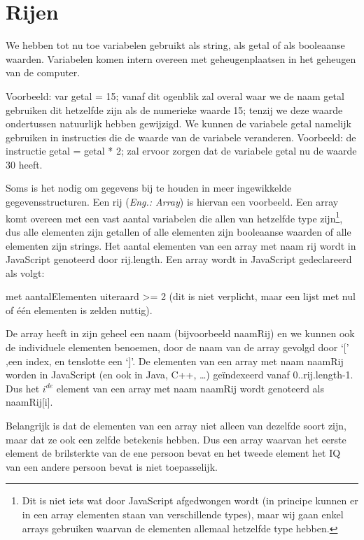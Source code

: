 \chapter{Rijen}

We hebben tot nu toe variabelen gebruikt als string, als getal of als booleaanse waarden. Variabelen komen intern overeen met geheugenplaatsen in het geheugen van de computer.

Voorbeeld: var getal = 15; vanaf dit ogenblik zal overal waar we de naam getal gebruiken dit hetzelfde zijn als de numerieke waarde 15; tenzij we deze waarde ondertussen natuurlijk hebben gewijzigd. We kunnen de variabele getal namelijk gebruiken in instructies die de waarde van de variabele veranderen. Voorbeeld: de instructie getal = getal * 2;  zal ervoor zorgen dat de variabele getal nu de waarde 30 heeft.

Soms is het nodig om gegevens bij te houden in meer ingewikkelde gegevensstructuren. Een rij (\emph{Eng.: Array}) is hiervan een voorbeeld. Een array komt overeen met een vast aantal variabelen die allen van hetzelfde type zijn\footnote{Dit is niet iets wat door JavaScript afgedwongen wordt (in principe kunnen er in een array elementen staan van verschillende types), maar wij gaan enkel arrays gebruiken waarvan de elementen allemaal hetzelfde type hebben.}, dus alle elementen zijn getallen of alle elementen zijn booleaanse waarden of alle elementen zijn strings. Het aantal elementen van een array met naam rij wordt in JavaScript genoteerd door rij.length. Een array wordt in JavaScript gedeclareerd als volgt:


met aantalElementen uiteraard >= 2 (dit is niet verplicht, maar een lijst met nul of \'e\'en elementen is zelden nuttig).

De array heeft in zijn geheel een naam (bijvoorbeeld naamRij) en we kunnen ook de individuele elementen benoemen, door de naam van de array gevolgd door `[' ,een index, en tenslotte een `]'. De elementen van een array met naam naamRij worden in JavaScript (en ook in Java, C++, \ldots) ge\"indexeerd vanaf 0..rij.length-1. Dus het $i^{de}$ element van een array met naam naamRij wordt genoteerd als naamRij[i].

Belangrijk is dat de elementen van een array niet alleen van dezelfde soort zijn, maar dat ze ook een zelfde betekenis hebben. Dus een array waarvan het eerste element de brilsterkte van de ene persoon bevat en het tweede element het IQ van een andere persoon bevat is niet toepasselijk.

